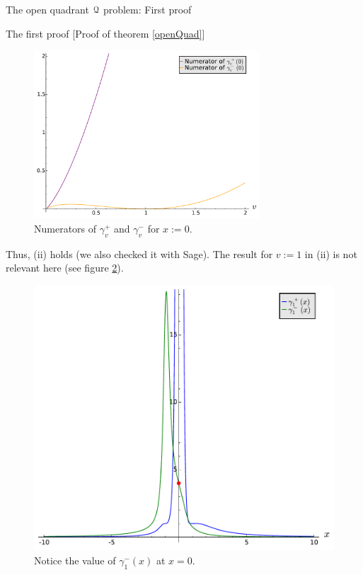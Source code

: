\documentclass[11pt, a4paper, english, twoside, notitlepage, openright]{report}
\begin{document}
\begin{chapter}{The open quadrant $\mathcal{Q}$ problem: First proof}
\begin{section}{The first proof} [Proof of theorem \ref{openQuad}]
\begin{figure}[h]
\centering
\includegraphics[width=0.75\textwidth]{plots/ch1_08_numerators.pdf}
\caption{Numerators of $\gamma_v^+$ and $\gamma_v^-$ for $x:=0$.\label{fig:numerators}}
\end{figure}
			
Thus, (ii) holds (we also checked it with Sage). The result for $v:=1$ in (ii) is not relevant here (see figure \ref{fig:limit}).
\begin{figure}[h]
\centering
\includegraphics[width=1\textwidth]{plots/ch1_09_limit.pdf}
\caption{Notice the value of $\gamma_1^-(x)$ at $x=0$.\label{fig:limit}}
\end{figure}


\end{section}
\end{chapter}
\end{document}
